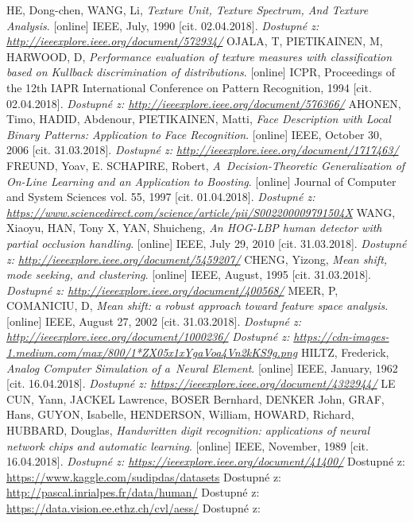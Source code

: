\begin{thebibliography}{99}
 	 HE, Dong-chen, WANG, Li, \textit{Texture Unit, Texture Spectrum, And Texture Analysis}. [online] IEEE, July, 1990 [cit. 02.04.2018]. 
 		\textit{Dostupné z: \url{http://ieeexplore.ieee.org/document/572934/}}
 	 OJALA, T, PIETIKAINEN, M, HARWOOD, D, \textit{Performance evaluation of texture measures with classification based on Kullback discrimination of distributions}. [online] ICPR, Proceedings of the 12th IAPR International Conference on Pattern Recognition, 1994 [cit. 02.04.2018]. 
 		\textit{Dostupné z: \url{http://ieeexplore.ieee.org/document/576366/}}
	 AHONEN, Timo, HADID, Abdenour, PIETIKAINEN, Matti, \textit{Face Description with Local Binary Patterns: Application to Face Recognition}. [online] IEEE, October 30, 2006 [cit. 31.03.2018]. 
 		\textit{Dostupné z: \url{http://ieeexplore.ieee.org/document/1717463/}}
 	 FREUND, Yoav, E. SCHAPIRE, Robert, \textit{A~Decision-Theoretic Generalization of On-Line Learning and an Application to Boosting}. [online] Journal of Computer and System Sciences vol. 55, 1997 [cit. 01.04.2018]. 
 		\textit{Dostupné z: \url{https://www.sciencedirect.com/science/article/pii/S002200009791504X}}
 	 WANG, Xiaoyu, HAN, Tony X, YAN, Shuicheng, \textit{An HOG-LBP human detector with partial occlusion handling}. [online] IEEE, July 29, 2010 [cit. 31.03.2018]. 
 		\textit{Dostupné z: \url{http://ieeexplore.ieee.org/document/5459207/}}
 	 CHENG, Yizong, \textit{Mean shift, mode seeking, and clustering}. [online] IEEE, August, 1995 [cit. 31.03.2018]. 
 		\textit{Dostupné z: \url{http://ieeexplore.ieee.org/document/400568/}}
 	 MEER, P, COMANICIU, D, \textit{Mean shift: a robust approach toward feature space analysis}. [online] IEEE, August 27, 2002 [cit. 31.03.2018]. 
 		\textit{Dostupné z: \url{http://ieeexplore.ieee.org/document/1000236/}}
	 \textit{Dostupné z: \url{https://cdn-images-1.medium.com/max/800/1*ZX05x1xYgaVoa4Vn2kKS9g.png}}
	 HILTZ, Frederick, \textit{Analog Computer Simulation of a~Neural Element}. [online] IEEE, January, 1962 [cit. 16.04.2018]. 
 	\textit{Dostupné z: \url{https://ieeexplore.ieee.org/document/4322944/}}
 	 LE CUN, Yann, JACKEL Lawrence, BOSER Bernhard, DENKER John, GRAF, Hans, GUYON, Isabelle, HENDERSON, William, HOWARD, Richard, HUBBARD, Douglas, \textit{Handwritten digit recognition: applications of neural network chips and automatic learning}. [online] IEEE, November, 1989 [cit. 16.04.2018]. 
 	\textit{Dostupné z: \url{https://ieeexplore.ieee.org/document/41400/}}
 	 Dostupné z: \url{https://www.kaggle.com/sudipdas/datasets}
 	 Dostupné z: \url{http://pascal.inrialpes.fr/data/human/}
 	 Dostupné z: \url{https://data.vision.ee.ethz.ch/cvl/aess/}
 	 Dostupné z:  


\end{thebibliography}
